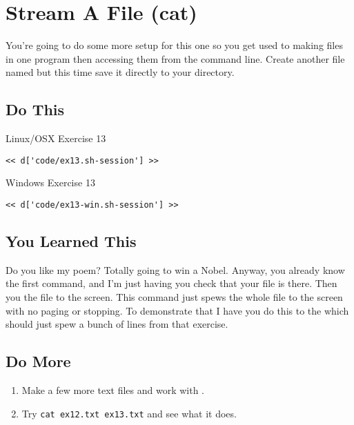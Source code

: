 \chapter{Stream A File (cat)}

You're going to do some more setup for this one so you get used to making files
in one program then accessing them from the command line.  Create another file
named  but this time save it directly to your 
directory.


\section{Do This}

\begin{code}{Linux/OSX Exercise 13}
\begin{Verbatim}
<< d['code/ex13.sh-session'] >>
\end{Verbatim}
\end{code}

\begin{code}{Windows Exercise 13}
\begin{Verbatim}
<< d['code/ex13-win.sh-session'] >>
\end{Verbatim}
\end{code}

\section{You Learned This}

Do you like my poem? Totally going to win a Nobel.  Anyway, you already know the first command, and I'm just having you check that your file is there.  Then you  the file to the screen.  This command just spews the whole file to the 
screen with no paging or stopping.  To demonstrate that I have you do this to the
 which should just spew a bunch of lines from that exercise.

\section{Do More}

\begin{enumerate}
\item Make a few more text files and work with .
\item Try \verb|cat ex12.txt ex13.txt| and see what it does.
\end{enumerate}

